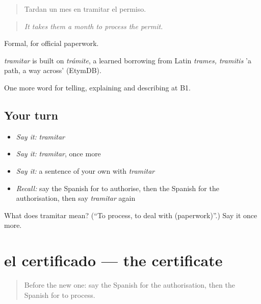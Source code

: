 \begin{quote}
Tardan un mes en tramitar el permiso.
\end{quote}

\begin{quote}
\emph{It takes them a month to process the permit.}
\end{quote}

Formal, for official paperwork.

\begin{cousinweb}
\emph{tramitar} is built on \emph{trámite}, a learned borrowing from Latin \emph{trames, tramitis} 'a path, a way across' (EtymDB).
\end{cousinweb}

\begin{grammarlens}[title={What you've built}]
One more word for telling, explaining and describing at B1.
\end{grammarlens}

\subsection*{Your turn}
\begin{itemize}
\raggedright
  \item \emph{Say it:} \emph{tramitar}
  \item \emph{Say it:} \emph{tramitar}, once more
  \item \emph{Say it:} a sentence of your own with \emph{tramitar}
  \item \emph{Recall:} say the Spanish for to authorise, then the Spanish for the authorisation, then say \emph{tramitar} again
\end{itemize}

\begin{tcolorbox}[breakable,colback=teal!4,colframe=teal!35!black,title={Before you move on}]
What does tramitar mean? (\textquotedblleft{}To process, to deal with (paperwork)\textquotedblright{}.) Say it once more.
\end{tcolorbox}
\section[el certificado]{el certificado — the certificate}

\label{lesson:ES-C624-certificado}



\begin{quote}
Before the new one: say the Spanish for the authorisation, then the Spanish for to process.
\end{quote}

